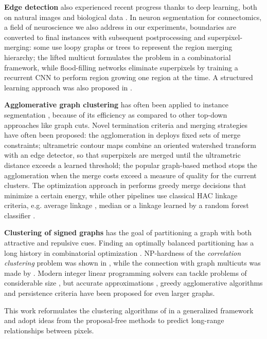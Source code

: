 \textbf{Edge detection} also experienced recent progress thanks to deep learning, both on natural images \cite{xie2015holistically,kokkinos2015pushing} and biological data \cite{lee2017superhuman,schmidt2018cell,meirovitch2016multi,ciresan2012deep}. In neuron segmentation for connectomics, a field of neuroscience we also address in our experiments, boundaries are converted to final instances with subsequent postprocessing and superpixel-merging:
some use loopy graphs \cite{kaynig2015large,krasowski2015improving} or trees \cite{meirovitch2016multi,liu2016sshmt,liu2014modular,funke2015learning,uzunbas2016efficient} to represent the region merging hierarchy; the lifted multicut \cite{beier2017multicut} formulates the problem in a combinatorial framework, while flood-filling networks \cite{januszewski2018high} eliminate superpixels by training a recurrent CNN to perform region growing one region at the time. A structured learning approach was also proposed in \cite{funke2018large,turaga2009maximin}.

\textbf{Agglomerative graph clustering} has often been applied to instance segmentation \cite{ren2013image,liu2016image,salembier2000binary}, because of its efficiency as compared to other top-down approaches like graph cuts. 
Novel termination criteria and merging strategies have often been proposed: the agglomeration in \cite{malmberg2011generalized} deploys fixed sets of merge constraints; ultrametric contour maps \cite{arbelaez2011contour} combine an oriented watershed transform with an edge detector, so that superpixels are merged until the ultrametric distance exceeds a learned threshold; the popular graph-based method \cite{felzenszwalb2004efficient} stops the agglomeration when the merge costs exceed a measure of quality for the current clusters. 
The optimization approach in \cite{kiran2014global} performs greedy merge decisions that minimize a certain energy, while other pipelines use classical HAC linkage criteria, e.g. average linkage \cite{liu2018affinity,lee2017superhuman}, median \cite{funke2018large} or a linkage learned by a random forest classifier \cite{nunez2013machine,knowles2016rhoananet}.

\textbf{Clustering of signed graphs} has the goal of partitioning a graph with both attractive and repulsive cues. Finding an optimally balanced partitioning has a long history in combinatorial optimization \cite{grotschel1989cutting,grotschel1990facets,chopra1993partition}. %
NP-hardness of the \emph{correlation clustering} problem was shown in \cite{bansal2004correlation}, while the connection with graph multicuts was made by \cite{demaine2006correlation}. Modern integer linear programming solvers can tackle problems of considerable size \cite{andres2012globally}, but accurate approximations \cite{pape2017solving,beier2016efficient,yarkony2012fast}, greedy agglomerative algorithms \cite{levinkov2017comparative,wolf2019mutex,keuper2015efficient,kardoostsolving} and persistence criteria \cite{lange2018partial,lange2018combinatorial} have been proposed for even larger graphs. 

This work reformulates the clustering algorithms of \cite{levinkov2017comparative,wolf2018mutex,keuper2015efficient} in a generalized framework and adopt ideas from the proposal-free methods \cite{liu2018affinity,wolf2018mutex,lee2017superhuman} to predict long-range relationships between pixels.
